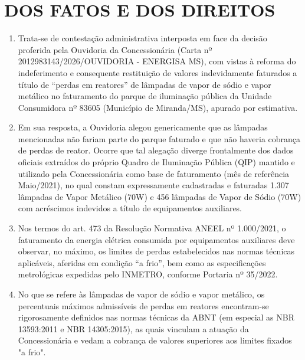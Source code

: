 \newcommand{\tipoRequerimento}{cobrança indevida por perda nos reatores de lâmpadas}

\newif\ifperdaVapor
\perdaVaportrue

\newif\ifperdaFluorescente
\perdaFluorescentefalse

\section{DOS FATOS E DOS DIREITOS}

\begin{enumerate}[resume]
\item 
Trata-se de contestação administrativa interposta em face da decisão proferida pela Ouvidoria da Concessionária (Carta nº 2012983143/2026/OUVIDORIA - ENERGISA MS), com vistas à reforma do indeferimento e consequente restituição de valores indevidamente faturados a título de “perdas em reatores” de lâmpadas de vapor de sódio e vapor metálico no faturamento do parque de iluminação pública da Unidade Consumidora nº 83605 (Município de Miranda/MS), apurado por estimativa.

\item
Em sua resposta, a Ouvidoria alegou genericamente que as lâmpadas mencionadas não fariam parte do parque faturado e que não haveria cobrança de perdas de reator. Ocorre que tal alegação diverge frontalmente dos dados oficiais extraídos do próprio Quadro de Iluminação Pública (QIP) mantido e utilizado pela Concessionária como base de faturamento (mês de referência Maio/2021), no qual constam expressamente cadastradas e faturadas 1.307 lâmpadas de Vapor Metálico (70W) e 456 lâmpadas de Vapor de Sódio (70W) com acréscimos indevidos a título de equipamentos auxiliares.

\item 
Nos termos do art. 473 da Resolução Normativa ANEEL nº 1.000/2021, o faturamento da energia elétrica consumida por equipamentos auxiliares deve observar, no máximo, os limites de perdas estabelecidos nas normas técnicas aplicáveis, aferidas em condição “a frio”, bem como as especificações metrológicas expedidas pelo INMETRO, conforme Portaria nº 35/2022.

\ifperdaVapor
\item %
No que se refere às lâmpadas de vapor de sódio e vapor metálico, os percentuais máximos admissíveis de perdas em reatores encontram-se rigorosamente definidos nas normas técnicas da ABNT (em especial as NBR 13593:2011 e NBR 14305:2015), as quais vinculam a atuação da Concessionária e vedam a cobrança de valores superiores aos limites fixados "a frio".
\fi


\end{enumerate}
